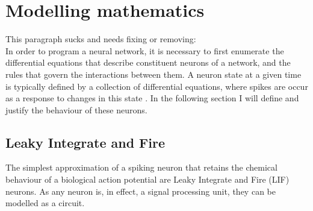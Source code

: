 \section{Modelling mathematics}

This paragraph sucks and needs fixing or removing: \\
In order to program a neural network, it is necessary to first enumerate the
differential equations that describe constituent neurons of a network, and the
rules that govern the interactions between them. A neuron
state at a given time is typically defined by a collection of differential
equations, where spikes are occur as a response to changes in this state \autocite{brette_simulation_2007}. In the
following section I will define and justify the behaviour of these neurons.

\subsection{Leaky Integrate and Fire}

The simplest approximation of a spiking neuron that retains the chemical
behaviour of a biological action potential are Leaky Integrate and Fire (LIF)
neurons. As any neuron is, in effect, a signal processing unit, they can be
modelled as a circuit.

